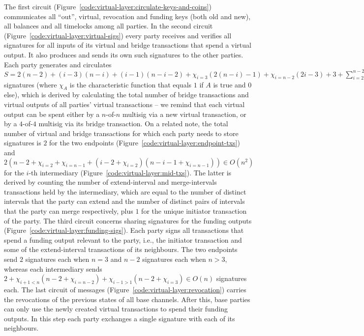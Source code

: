   The first circuit (Figure~\ref{code:virtual-layer:circulate-keys-and-coins})
  communicates all ``out'', virtual, revocation and funding keys (both old and new), all
  balances and all timelocks among all parties. In the second circuit
  (Figure~\ref{code:virtual-layer:virtual-sigs}) every party receives and
  verifies all signatures for all inputs of its virtual and bridge transactions
  that spend a virtual output. It also produces and sends its own such
  signatures to the other parties. Each party generates and circulates
  $S = 2(n-2) + (i-3)(n-i) +(i-1)(n-i-2) + \chi_{i=3}(2(n-i)-1) +
  \chi_{i=n-2}(2i-3) + 3 + \sum\limits_{i = 2}^{n-2} (n-3 + \chi_{i = 2} +
  \chi_{i = n - 1} + 2(i - 2 + \chi_{i = 2})(n - i - 1 + \chi_{i = n - 1})) \in
  O(n^3)$ signatures (where $\chi_A$ is the characteristic function that equals
  $1$ if $A$ is true and $0$ else), which is derived by calculating the total
  number of bridge transactions and virtual outputs of all parties' virtual
  transactions -- we remind that each virtual output can be spent either by a
  $n$-of-$n$ multisig via a new virtual transaction, or by a $4$-of-$4$ multisig
  via its bridge transaction.
  On a related note, the total number of virtual and bridge transactions for
  which each party needs to store signatures is $2$ for the two endpoints
  (Figure~\ref{code:virtual-layer:endpoint-txs}) and $2(n - 2 + \chi_{i = 2} +
  \chi_{i = n - 1} +  (i - 2 + \chi_{i = 2}) (n - i - 1 + \chi_{i = n-1})) \in
  O(n^2)$ for the $i$-th intermediary
  (Figure~\ref{code:virtual-layer:mid-txs}). The latter is derived by counting
  the number of extend-interval and merge-intervals transactions held by the
  intermediary, which are equal to the number of distinct intervals that the
  party can extend and the number of distinct pairs of intervals that the party
  can merge respectively, plus $1$ for the unique initiator transaction of the
  party.
  The third circuit concerns sharing signatures for the funding outputs
  (Figure~\ref{code:virtual-layer:funding-sigs}). Each party signs all
  transactions that spend a funding output relevant to the party, i.e., the
  initiator transaction and some of the extend-interval transactions of its
  neighbours. The two endpoints send $2$ signatures each when $n = 3$ and $n -
  2$ signatures each when $n > 3$, whereas each intermediary sends $2 + \chi_{i
  + 1 < n}(n - 2 + \chi_{i = n - 2}) + \chi_{i - 1 > 1}(n - 2 + \chi_{i = 3})
  \in O(n)$ signatures each. The last circuit of messages
  (Figure~\ref{code:virtual-layer:revocation}) carries the revocations of the
  previous states of all base channels. After this, base parties can only use
  the newly created virtual transactions to spend their funding outputs. In this
  step each party exchanges a single signature with each of its neighbours.

